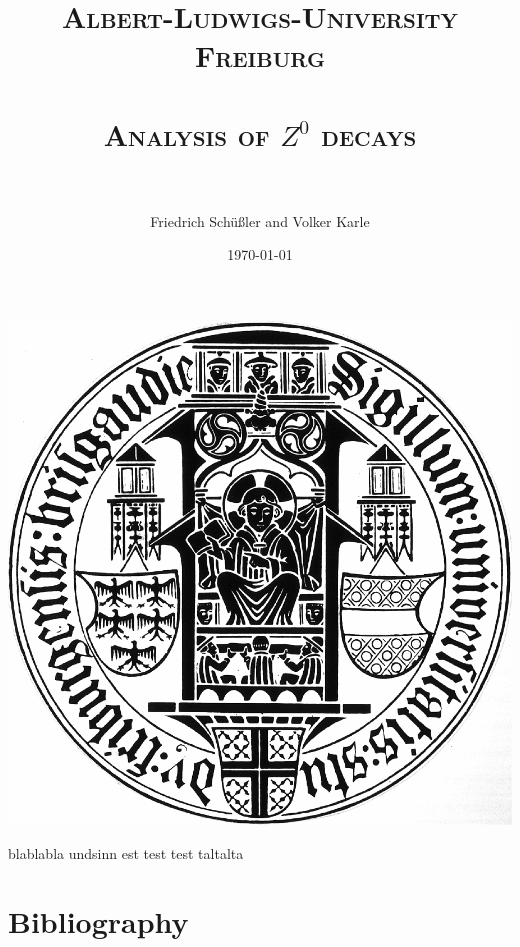 \documentclass[paper=a4, fontsize=12pt, xcolor=dvipsnames]{scrartcl} %
\title{
\normalfont \normalsize 
\textsc{Albert-Ludwigs-University Freiburg} \\ [25pt] %
\horrule{0.5pt} \\[0.4cm] %
\huge \textsc{Analysis of $Z^0$ decays} \\ %
\horrule{2pt} \\[0.5cm] %
}
\author{Friedrich Schüßler and Volker Karle} %
\date{\normalsize\today} %
\numberwithin{equation}{section} %
\numberwithin{figure}{section} %
\numberwithin{table}{section} %
\begin{document}
\color{gray1}
\maketitle
\begin{center}
 \includegraphics[width=0.6\linewidth]{figures/unifreiburg}
\end{center}
\thispagestyle{empty}
\newpage
    {\pagestyle{plain}
    \thispagestyle{empty}
    \tableofcontents
    \thispagestyle{empty}
    \cleardoublepage}
\newpage



\setcounter{page}{1}
blablabla
undsinn
est test test
taltalta
\cite{python}





\clearpage

\section{Bibliography}
\printbibliography[heading=subbibintoc]
\clearpage
\end{document}
